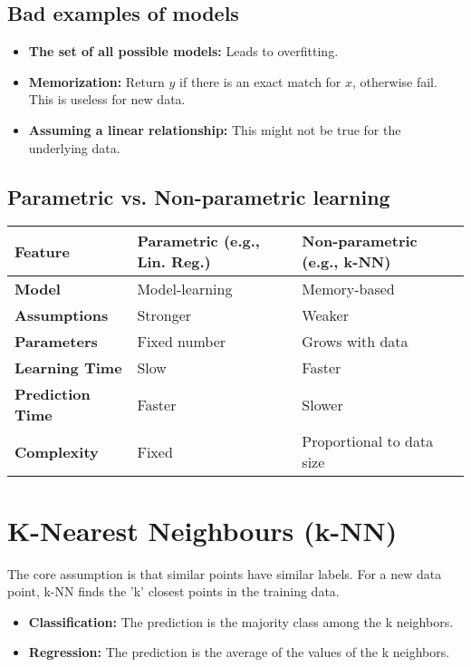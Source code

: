 \documentclass{article}
\begin{document}
\begin{multicols}{2}
\subsection{Bad examples of models}
\begin{itemize}
    \item \textbf{The set of all possible models:} Leads to overfitting. 
    \item \textbf{Memorization:} Return $y$ if there is an exact match for $x$, otherwise fail. This is useless for new data. 
    \item \textbf{Assuming a linear relationship:} This might not be true for the underlying data. 
\end{itemize}

\subsection{Parametric vs. Non-parametric learning}
\begin{table}[h!]
\centering
\begin{tabular}{|l|l|l|}
\hline
\textbf{Feature} & \textbf{Parametric (e.g., Lin. Reg.)} & \textbf{Non-parametric (e.g., k-NN)} \\
\hline
\textbf{Model} & Model-learning & Memory-based  \\
\textbf{Assumptions} & Stronger & Weaker  \\
\textbf{Parameters} & Fixed number & Grows with data  \\
\textbf{Learning Time} & Slow & Faster  \\
\textbf{Prediction Time} & Faster & Slower  \\
\textbf{Complexity} & Fixed & Proportional to data size  \\
\hline
\end{tabular}
\end{table}

\section{K-Nearest Neighbours (k-NN)}
The core assumption is that similar points have similar labels.  For a new data point, k-NN finds the 'k' closest points in the training data.

\begin{itemize}
    \item \textbf{Classification:} The prediction is the majority class among the k neighbors. 
    \item \textbf{Regression:} The prediction is the average of the values of the k neighbors. 
\end{itemize}


\end{multicols}
\end{document}
